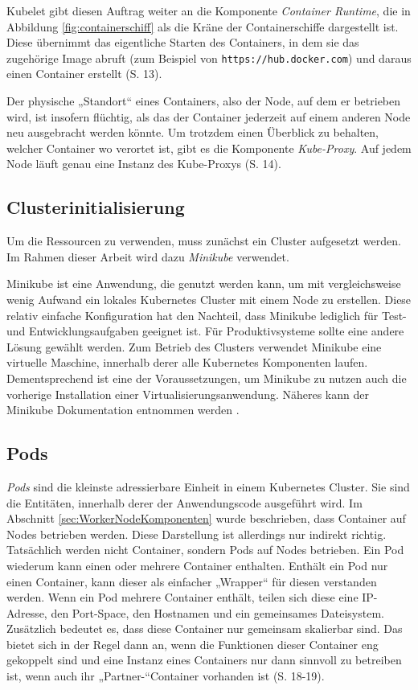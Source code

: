 \documentclass[11pt,a4paper]{article}
\begin{document}
Kubelet gibt diesen Auftrag weiter an die Komponente \emph{Container Runtime}, die
in Abbildung \ref{fig:containerschiff} als die Kräne der Containerschiffe dargestellt ist.
Diese übernimmt das eigentliche Starten des Containers, in dem sie das zugehörige Image
abruft (zum Beispiel von \lstinline|https://hub.docker.com|) und daraus einen Container erstellt \cite{Schmeling_Dargatz_2022} (S. 13).

Der physische „Standort“ eines Containers, also der Node, auf dem er betrieben wird, ist insofern
flüchtig, als das der Container jederzeit auf einem anderen Node neu ausgebracht werden könnte.
Um trotzdem einen Überblick zu behalten, welcher Container wo verortet ist, gibt es die Komponente
\emph{Kube-Proxy}. Auf jedem Node läuft genau eine Instanz des Kube-Proxys \cite{Schmeling_Dargatz_2022} (S. 14).

\subsection{Clusterinitialisierung}
Um die Ressourcen zu verwenden, muss zunächst ein Cluster aufgesetzt werden.
Im Rahmen dieser Arbeit wird dazu \emph{Minikube} verwendet.

Minikube ist eine Anwendung, die genutzt werden kann, um mit vergleichsweise wenig Aufwand ein lokales
Kubernetes Cluster mit einem Node zu erstellen. Diese relativ einfache Konfiguration hat
den Nachteil, dass Minikube lediglich für Test- und Entwicklungsaufgaben geeignet ist.
Für Produktivsysteme sollte eine andere Lösung gewählt werden. %
Zum Betrieb des Clusters verwendet Minikube eine virtuelle Maschine, innerhalb derer
alle Kubernetes Komponenten laufen. Dementsprechend ist eine der Voraussetzungen,
um Minikube zu nutzen auch die vorherige Installation einer Virtualisierungsanwendung.
Näheres kann der Minikube Dokumentation entnommen werden \cite{minikube}.

\subsection{Pods}
\emph{Pods} sind die kleinste adressierbare Einheit in einem Kubernetes Cluster.
Sie sind die Entitäten, innerhalb derer der Anwendungscode ausgeführt wird.
Im Abschnitt \ref{sec:WorkerNodeKomponenten} wurde beschrieben, dass Container auf Nodes betrieben werden.
Diese Darstellung ist allerdings nur indirekt richtig. Tatsächlich werden nicht Container,
sondern Pods auf Nodes betrieben.
Ein Pod wiederum kann einen oder mehrere Container enthalten. Enthält ein Pod nur einen Container,
kann dieser als einfacher „Wrapper“ für diesen verstanden werden.
Wenn ein Pod mehrere Container enthält, teilen sich diese eine IP-Adresse,
den Port-Space, den Hostnamen und ein gemeinsames Dateisystem.
Zusätzlich bedeutet es, dass diese Container nur gemeinsam skalierbar sind.
Das bietet sich in der Regel dann an, wenn die Funktionen dieser Container eng gekoppelt sind und eine Instanz eines
Containers nur dann sinnvoll zu betreiben ist, wenn auch ihr „Partner-“Container vorhanden ist \cite{9783969109625} \cite{Schmeling_Dargatz_2022} (S. 18-19).
\end{document}
